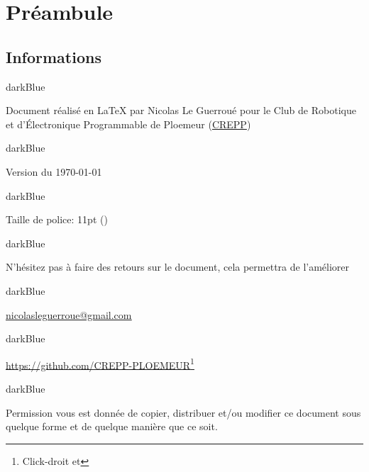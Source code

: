 \chapter*{Préambule}

\section*{Informations}

\begin{items}{darkBlue}{\faFile}
    \item Document réalisé en \LaTeX{} par Nicolas Le Guerroué pour le Club de Robotique et d’Électronique Programmable de Ploemeur (\href{www.crepp.org}{CREPP}) 
\end{items}

\begin{items}{darkBlue}{\faHistory}
    \item Version du \today
\end{items}

\begin{items}{darkBlue}{\faFont}
    \item Taille de police: 11pt (\getCurrentFont)
\end{items}

\begin{items}{darkBlue}{\faComment}
    \item N'hésitez pas à faire des retours sur le document, cela permettra de l'améliorer
\end{items}
\begin{items}{darkBlue}{\faEnvelope}
    \item \underline{\href{mailto:nicolasleguerroue@gmail.com}{nicolasleguerroue@gmail.com}}
\end{items}

\begin{items}{darkBlue}{\faGithub}
    \item \href{https://github.com/CREPP-PLOEMEUR}{https://github.com/CREPP-PLOEMEUR\footnote{Click-droit et }}
\end{items} 

\begin{items}{darkBlue}{\faCertificate}
    \item Permission vous est donnée de copier, distribuer et/ou modifier ce document sous quelque forme et de 
    quelque manière que ce soit.
\end{items}

